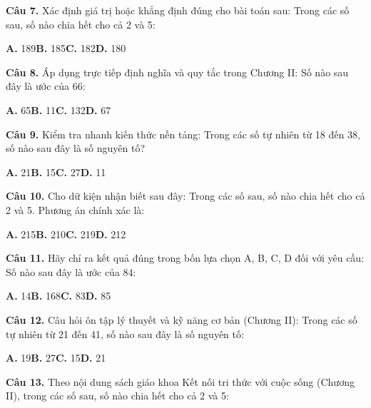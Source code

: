 \documentclass[11pt,a4paper]{article}
\begin{document}
\textbf{\color{primary} Câu 7.} Xác định giá trị hoặc khẳng định đúng cho bài toán sau: Trong các số sau, số nào chia hết cho cả 2 và 5:\par
\hspace*{1.5em}\textbf{A.} 189\quad\quad \textbf{B.} 185\quad\quad \textbf{C.} 182\quad\quad \textbf{D.} 180\par\vspace{2pt}
\textbf{\color{primary} Câu 8.} Áp dụng trực tiếp định nghĩa và quy tắc trong Chương II: Số nào sau đây là ước của 66:\par
\hspace*{1.5em}\textbf{A.} 65\quad\quad \textbf{B.} 11\quad\quad \textbf{C.} 132\quad\quad \textbf{D.} 67\par\vspace{2pt}
\textbf{\color{primary} Câu 9.} Kiểm tra nhanh kiến thức nền tảng: Trong các số tự nhiên từ 18 đến 38, số nào sau đây là số nguyên tố?\par
\hspace*{1.5em}\textbf{A.} 21\quad\quad \textbf{B.} 15\quad\quad \textbf{C.} 27\quad\quad \textbf{D.} 11\par\vspace{2pt}
\textbf{\color{primary} Câu 10.} Cho dữ kiện nhận biết sau đây: Trong các số sau, số nào chia hết cho cả 2 và 5. Phương án chính xác là:\par
\hspace*{1.5em}\textbf{A.} 215\quad\quad \textbf{B.} 210\quad\quad \textbf{C.} 219\quad\quad \textbf{D.} 212\par\vspace{2pt}
\textbf{\color{primary} Câu 11.} Hãy chỉ ra kết quả đúng trong bốn lựa chọn A, B, C, D đối với yêu cầu: Số nào sau đây là ước của 84:\par
\hspace*{1.5em}\textbf{A.} 14\quad\quad \textbf{B.} 168\quad\quad \textbf{C.} 83\quad\quad \textbf{D.} 85\par\vspace{2pt}
\textbf{\color{primary} Câu 12.} Câu hỏi ôn tập lý thuyết và kỹ năng cơ bản (Chương II): Trong các số tự nhiên từ 21 đến 41, số nào sau đây là số nguyên tố:\par
\hspace*{1.5em}\textbf{A.} 19\quad\quad \textbf{B.} 27\quad\quad \textbf{C.} 15\quad\quad \textbf{D.} 21\par\vspace{2pt}
\textbf{\color{primary} Câu 13.} Theo nội dung sách giáo khoa Kết nối tri thức với cuộc sống (Chương II), trong các số sau, số nào chia hết cho cả 2 và 5:\par
\end{document}

